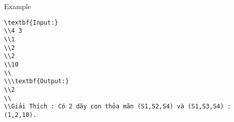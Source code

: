 Example
\begin{verbatim}
\textbf{Input:}
\\4 3
\\1
\\2
\\2
\\10
\\
\\\textbf{Output:}
\\2
\\
\\Giải Thích : Có 2 dãy con thỏa mãn (S1,S2,S4) và (S1,S3,S4) : (1,2,10).\end{verbatim}